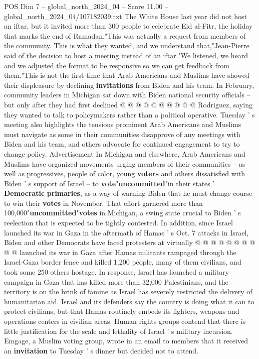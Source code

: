 \begin{textsample}{POS Dim 7 – global\_north\_2024\_04 – Score 11.00 – global\_north\_2024\_04/107182039.txt}
The White House last year did not host an iftar, but it invited more than 300 people to celebrate Eid al-Fitr, the holiday that marks the end of Ramadan."This was actually a request from members of the community.
This is what they wanted, and we understand that,"Jean-Pierre said of the decision to host a meeting instead of an iftar."We listened, we heard and we adjusted the format to be responsive so we can get feedback from them."This is not the first time that Arab Americans and Muslims have showed their displeasure by declining \textbf{invitations} from Biden and his team.
In February, community leaders in Michigan sat down with Biden national security officials -- but only after they had first declined @ @ @ @ @ @ @ @ @ @ Rodriguez, saying they wanted to talk to policymakers rather than a political operative.
Tuesday ' s meeting also highlights the tensions prominent Arab Americans and Muslims must navigate as some in their communities disapprove of any meetings with Biden and his team, and others advocate for continued engagement to try to change policy.
Advertisement In Michigan and elsewhere, Arab Americans and Muslims have organized movements urging members of their communities -- as well as progressives, people of color, young \textbf{voters} and others dissatisfied with Biden ' s support of Israel -- to \textbf{vote}"\textbf{uncommitted}"in their states ' \textbf{Democratic} \textbf{primaries}, as a way of warning Biden that he must change course to win their \textbf{votes} in November.
That effort garnered more than 100,000"\textbf{uncommitted}"\textbf{votes} in Michigan, a swing state crucial to Biden ' s reelection that is expected to be tightly contested.
In addition, since Israel launched its war in Gaza in the aftermath of Hamas ' s Oct. 7 attacks in Israel, Biden and other Democrats have faced protesters at virtually @ @ @ @ @ @ @ @ @ @ launched its war in Gaza after Hamas militants rampaged through the Israel-Gaza border fence and killed 1,200 people, many of them civilians, and took some 250 others hostage.
In response, Israel has launched a military campaign in Gaza that has killed more than 32,000 Palestinians, and the territory is on the brink of famine as Israel has severely restricted the delivery of humanitarian aid.
Israel and its defenders say the country is doing what it can to protect civilians, but that Hamas routinely embeds its fighters, weapons and operations centers in civilian areas.
Human rights groups contend that there is little justification for the scale and lethality of Israel ' s military incursion.
Emgage, a Muslim voting group, wrote in an email to members that it received an \textbf{invitation} to Tuesday ' s dinner but decided not to attend.

\end{textsample}
